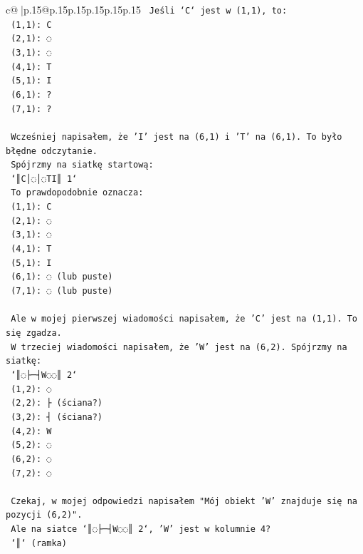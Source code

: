 \documentclass{article}
\begin{document}
{\begin{supertabular}{c@{$\;$}|p{.15\linewidth}@{}p{.15\linewidth}p{.15\linewidth}p{.15\linewidth}p{.15\linewidth}p{.15\linewidth}}
{{{\texttt{   Jeśli `C` jest w (1,1), to:} \\
\texttt{   (1,1): C} \\
\texttt{   (2,1): ◌} \\
\texttt{   (3,1): ◌} \\
\texttt{   (4,1): T} \\
\texttt{   (5,1): I} \\
\texttt{   (6,1): ?} \\
\texttt{   (7,1): ?} \\
\\ 
\texttt{   Wcześniej napisałem, że 'I' jest na (6,1) i 'T' na (6,1). To było błędne odczytanie.} \\
\texttt{   Spójrzmy na siatkę startową:} \\
\texttt{   `║C│◌│◌TI║ 1`} \\
\texttt{   To prawdopodobnie oznacza:} \\
\texttt{   (1,1): C} \\
\texttt{   (2,1): ◌} \\
\texttt{   (3,1): ◌} \\
\texttt{   (4,1): T} \\
\texttt{   (5,1): I} \\
\texttt{   (6,1): ◌ (lub puste)} \\
\texttt{   (7,1): ◌ (lub puste)} \\
\\ 
\texttt{   Ale w mojej pierwszej wiadomości napisałem, że 'C' jest na (1,1). To się zgadza.} \\
\texttt{   W trzeciej wiadomości napisałem, że 'W' jest na (6,2). Spójrzmy na siatkę:} \\
\texttt{   `║◌├─┤W◌◌║ 2`} \\
\texttt{   (1,2): ◌} \\
\texttt{   (2,2): ├ (ściana?)} \\
\texttt{   (3,2): ┤ (ściana?)} \\
\texttt{   (4,2): W} \\
\texttt{   (5,2): ◌} \\
\texttt{   (6,2): ◌} \\
\texttt{   (7,2): ◌} \\
\\ 
\texttt{   Czekaj, w mojej odpowiedzi napisałem "Mój obiekt 'W' znajduje się na pozycji (6,2)".} \\
\texttt{   Ale na siatce `║◌├─┤W◌◌║ 2`, 'W' jest w kolumnie 4?} \\
\texttt{   `║` (ramka)} \\
}}}
\end{supertabular}}
\end{document}
